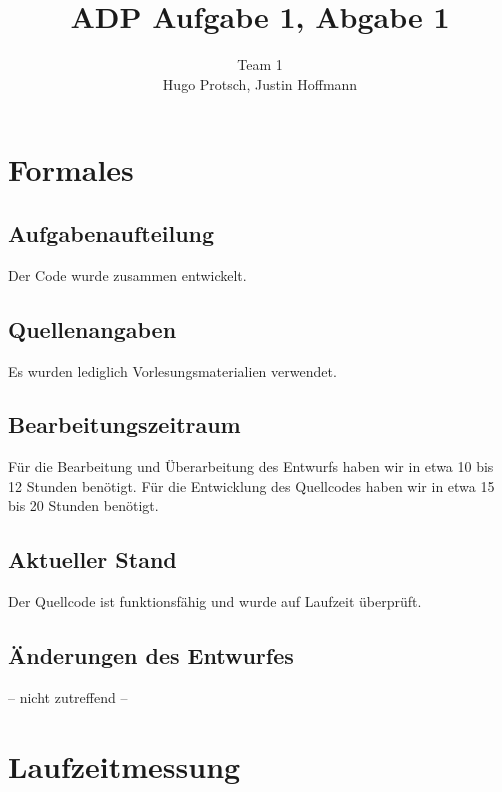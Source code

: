 \documentclass[11pt]{article}
\title{ADP Aufgabe 1, Abgabe 1}
\author{Team 1\\Hugo Protsch, Justin Hoffmann}
\begin{document}
    \maketitle


    \section{Formales}\label{sec:Formales}


    \subsection{Aufgabenaufteilung}
    Der Code wurde zusammen entwickelt.

    \subsection{Quellenangaben}

    Es wurden lediglich Vorlesungsmaterialien verwendet.


    \subsection{Bearbeitungszeitraum}
    Für die Bearbeitung und Überarbeitung des Entwurfs haben wir in etwa 10 bis
    12 Stunden benötigt.
    Für die Entwicklung des Quellcodes haben wir in etwa 15 bis 20 Stunden
    benötigt.

    \subsection{Aktueller Stand}
    Der Quellcode ist funktionsfähig und wurde auf Laufzeit überprüft.


    \subsection{Änderungen des Entwurfes}
    -- nicht zutreffend --


    \section{Laufzeitmessung}\label{sec:laufzeitmessung}
\end{document}
